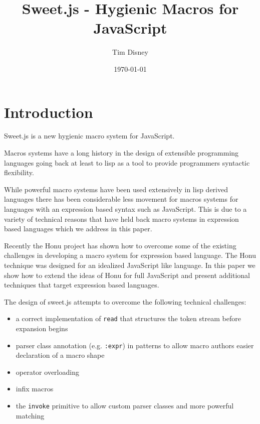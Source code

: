 \documentclass[onecolumn]{sigplanconf-onecolumn}
\author{Tim Disney}
\date{\today}
\title{Sweet.js - Hygienic Macros for JavaScript}
\begin{document}

\lstset{
   language=JavaScript,
   extendedchars=true,
   basicstyle=\footnotesize\ttfamily,
   showstringspaces=false,
   showspaces=false,
   numberstyle=\footnotesize,
   numbersep=9pt,
   tabsize=2,
   breaklines=true,
   showtabs=false,
   captionpos=b
}


\maketitle

\section{Introduction}
\label{sec-1}

Sweet.js is a new hygienic macro system for JavaScript.

Macros systems have a long history in the design of extensible
programming languages going back at least to lisp as a tool to provide
programmers syntactic flexibility.

While powerful macro systems have been used extensively in lisp
derived languages there has been considerable less movement for macros
systems for languages with an expression based syntax such as
JavaScript. This is due to a variety of technical reasons that have
held back macro systems in expression based languages which we address
in this paper.

Recently the Honu project has shown how to overcome some of the
existing challenges in developing a macro system for expression based
language. The Honu technique was designed for an idealized JavaScript
like language. In this paper we show how to extend the ideas of Honu
for full JavaScript and present additional techniques that target
expression based languages.

The design of sweet.js attempts to overcome the following technical
challenges: 

\begin{itemize}
\item a correct implementation of \texttt{read} that structures the
  token stream before expansion begins
\item parser class annotation (e.g. \texttt{:expr}) in patterns to
  allow macro authors easier declaration of a macro shape
\item operator overloading
\item infix macros
\item the \texttt{invoke} primitive to allow custom parser classes and
  more powerful matching
\end{itemize}
\end{document}
